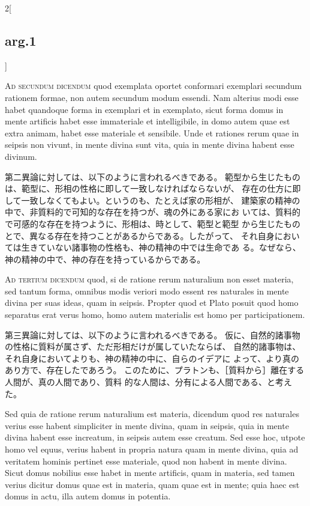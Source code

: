 \documentclass[paper=a4paper,fontsize=10pt,jafontsize=9pt,titlepage]{jlreq}
\begin{document}
\begin{paracol}{2}[\subsection{arg.1}]
\switchcolumn*[\subsection{ad.2}]


{\scshape Ad secundum dicendum} quod exemplata oportet
 conformari exemplari secundum rationem formae, non autem secundum modum
 essendi. Nam alterius modi esse habet quandoque forma in exemplari et
 in exemplato, sicut forma domus in mente artificis habet esse
 immateriale et intelligibile, in domo autem quae est extra animam,
 habet esse materiale et sensibile. Unde et rationes rerum quae in
 seipsis non vivunt, in mente divina sunt vita, quia in mente divina
 habent esse divinum.

\switchcolumn

第二異論に対しては、以下のように言われるべきである。
範型から生じたものは、範型に、形相の性格に即して一致しなければならないが、
 存在の仕方に即して一致しなくてもよい。というのも、たとえば家の形相が、
 建築家の精神の中で、非質料的で可知的な存在を持つが、魂の外にある家にお
 いては、質料的で可感的な存在を持つように、形相は、時として、範型と範型
 から生じたものとで、異なる存在を持つことがあるからである。したがって、
 それ自身においては生きていない諸事物の性格も、神の精神の中では生命であ
 る。なぜなら、神の精神の中で、神の存在を持っているからである。

\switchcolumn*[\subsection{ad.3}]


{\scshape Ad tertium dicendum} quod, si de ratione rerum
 naturalium non esset materia, sed tantum forma, omnibus modis veriori
 modo essent res naturales in mente divina per suas ideas, quam in
 seipsis. Propter quod et Plato posuit quod homo separatus erat verus
 homo, homo autem materialis est homo per participationem.

\switchcolumn

第三異論に対しては、以下のように言われるべきである。
仮に、自然的諸事物の性格に質料が属さず、ただ形相だけが属していたならば、
 自然的諸事物は、それ自身においてよりも、神の精神の中に、自らのイデアに
 よって、より真のあり方で、存在したであろう。
このために、プラトンも、［質料から］離在する人間が、真の人間であり、質料
 的な人間は、分有による人間である、と考えた。

\switchcolumn*


Sed quia de
 ratione rerum naturalium est materia, dicendum quod res naturales
 verius esse habent simpliciter in mente divina, quam in seipsis, quia
 in mente divina habent esse increatum, in seipsis autem esse
 creatum. Sed esse hoc, utpote homo vel equus, verius habent in propria
 natura quam in mente divina, quia ad veritatem hominis pertinet esse
 materiale, quod non habent in mente divina. Sicut domus nobilius esse
 habet in mente artificis, quam in materia, sed tamen verius dicitur
 domus quae est in materia, quam quae est in mente; quia haec est domus
 in actu, illa autem domus in potentia.


\end{paracol}
\end{document}
